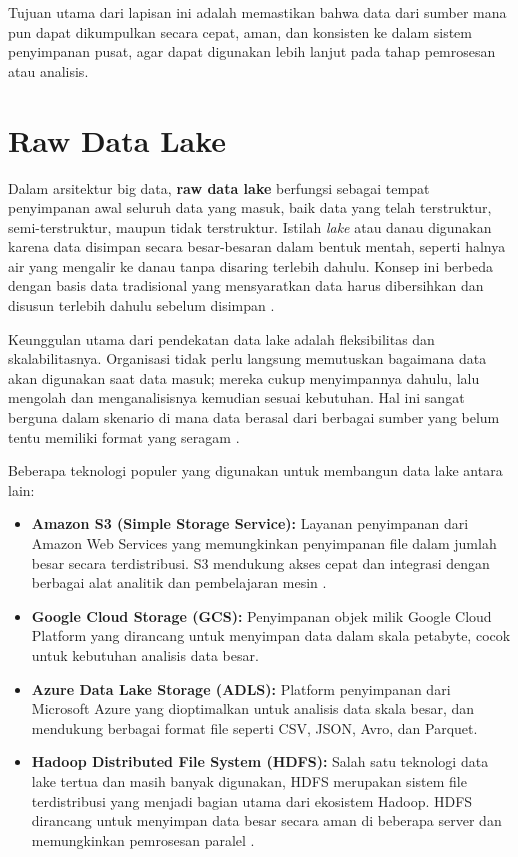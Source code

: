 Tujuan utama dari lapisan ini adalah memastikan bahwa data dari sumber mana pun dapat dikumpulkan secara cepat, aman, dan konsisten ke dalam sistem penyimpanan pusat, agar dapat digunakan lebih lanjut pada tahap pemrosesan atau analisis.



\section{Raw Data Lake}

Dalam arsitektur big data, \textbf{raw data lake} berfungsi sebagai tempat penyimpanan awal seluruh data yang masuk, baik data yang telah terstruktur, semi-terstruktur, maupun tidak terstruktur. Istilah \textit{lake} atau danau digunakan karena data disimpan secara besar-besaran dalam bentuk mentah, seperti halnya air yang mengalir ke danau tanpa disaring terlebih dahulu. Konsep ini berbeda dengan basis data tradisional yang mensyaratkan data harus dibersihkan dan disusun terlebih dahulu sebelum disimpan \cite{ghosh2016journey}.

Keunggulan utama dari pendekatan data lake adalah fleksibilitas dan skalabilitasnya. Organisasi tidak perlu langsung memutuskan bagaimana data akan digunakan saat data masuk; mereka cukup menyimpannya dahulu, lalu mengolah dan menganalisisnya kemudian sesuai kebutuhan. Hal ini sangat berguna dalam skenario di mana data berasal dari berbagai sumber yang belum tentu memiliki format yang seragam \cite{urbach2017data}.

Beberapa teknologi populer yang digunakan untuk membangun data lake antara lain:

\begin{itemize}
	\item \textbf{Amazon S3 (Simple Storage Service):} Layanan penyimpanan dari Amazon Web Services yang memungkinkan penyimpanan file dalam jumlah besar secara terdistribusi. S3 mendukung akses cepat dan integrasi dengan berbagai alat analitik dan pembelajaran mesin \cite{awss3docs}.
	
	\item \textbf{Google Cloud Storage (GCS):} Penyimpanan objek milik Google Cloud Platform yang dirancang untuk menyimpan data dalam skala petabyte, cocok untuk kebutuhan analisis data besar.
	
	\item \textbf{Azure Data Lake Storage (ADLS):} Platform penyimpanan dari Microsoft Azure yang dioptimalkan untuk analisis data skala besar, dan mendukung berbagai format file seperti CSV, JSON, Avro, dan Parquet.
	
	\item \textbf{Hadoop Distributed File System (HDFS):} Salah satu teknologi data lake tertua dan masih banyak digunakan, HDFS merupakan sistem file terdistribusi yang menjadi bagian utama dari ekosistem Hadoop. HDFS dirancang untuk menyimpan data besar secara aman di beberapa server dan memungkinkan pemrosesan paralel \cite{shvachko2010hadoop}.
\end{itemize}

